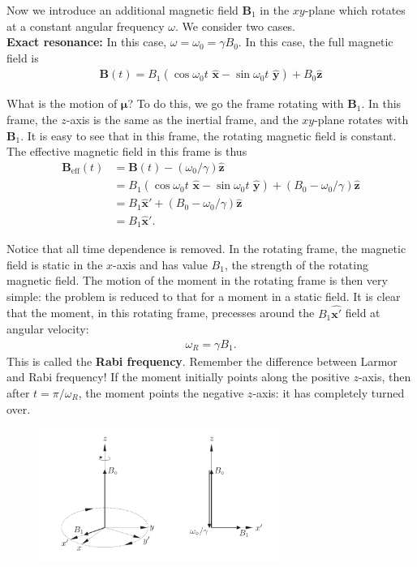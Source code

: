\documentclass{book}
\theoremstyle{definition}
\begin{document}
Now we introduce an additional magnetic field $\bm{B}_1$ in the $xy$-plane which rotates at a constant angular frequency $\omega$. We consider two cases. \\



\noindent \textbf{Exact resonance:} In this case, $\omega = \omega_0 = \gamma B_0$. In this case, the full magnetic field is 
\begin{align*}
	\bm{B}(t) = B_1(\cos\omega_0 t \,\, \hat{\bm{x}} -\sin\omega_0 t \,\, \hat{\bm{y}}) + B_0 \hat{\bm{z}}
\end{align*}


What is the motion of $\bm{\mu}$? To do this, we go the frame rotating with $\bm{B}_1$. In this frame, the $z$-axis is the same as the inertial frame, and the $xy$-plane rotates with $\bm{B}_1$. It is easy to see that in this frame, the rotating magnetic field is constant. The effective magnetic field in this frame is thus
\begin{align*}
	\bm{B}_\text{eff}(t) 
	&= \bm{B}(t) - (\omega_0/\gamma) \hat{\bm{z}}\\
	&= B_1(\cos\omega_0 t \,\, \hat{\bm{x}} -\sin\omega_0 t \,\, \hat{\bm{y}}) + (B_0 - \omega_0/\gamma) \hat{\bm{z}}\\
	&= B_1 \hat{\bm{x}}'  + (B_0 - \omega_0/\gamma) \hat{\bm{z}}\\
	&= B_1 \hat{\bm{x}}'.
\end{align*}

Notice that all time dependence is removed. In the rotating frame, the magnetic field is static in the $x$-axis and has value $B_1$, the strength of the rotating magnetic field. The motion of the moment in the rotating frame is then very simple: the problem is reduced to that for a moment in a static field. It is clear that the moment, in this rotating frame, precesses around the $B_1 \hat{\bm{x}'}$ field at angular velocity:
\begin{align*}
	\omega_R = \gamma B_1.
\end{align*}
This is called the \textbf{Rabi frequency}. Remember the difference between Larmor and Rabi frequency! If the moment initially points along the positive $z$-axis, then after $t = \pi/\omega_R$, the moment points the negative $z$-axis: it has completely turned over. 

\begin{figure}[!htb]
	\centering
	\includegraphics[width=0.7\textwidth]{figures/rotatingB.png}
\end{figure}
\end{document}

